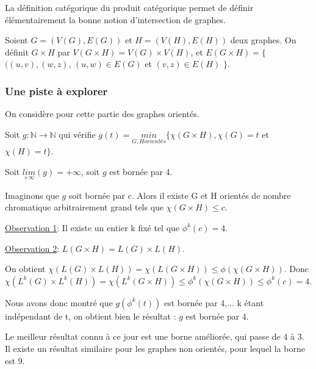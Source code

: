 La définition catégorique du produit catégorique permet de définir élémentairement la bonne notion d'intersection de graphes.

\begin{definition}
	Soient $G = (V(G),E(G))$ et $H = (V(H),E(H))$ deux graphes. On définit $G \times H$ par $V(G \times H) = V(G) \times V(H)$, et $E(G \times H) = \{$ $((u,v),(w,z)$, $(u,w) \in E(G)$ et $(v,z) \in E(H)$ $\}$.
\end{definition}

\subsubsection{Une piste à explorer}

On considère pour cette partie des graphes orientés.

Soit $g : \mathbb{N} \longrightarrow \mathbb{N}$ qui vérifie $g(t) = \underset{G,H orientés}{min} \{ \chi(G \times H), \chi(G) = t $ et $ \chi (H) = t \}$.

\begin{theoreme}
	Soit $\underset{+ \infty}{lim} (g) = + \infty$, soit $g$ est bornée par 4.
\end{theoreme}

\begin{preuve}
	Imaginons que $g$ soit bornée par c. Alors il existe G et H orientés de nombre chromatique arbitrairement grand tels que $\chi(G \times H) \le c$.
	
	\underline{Observation 1}: Il existe un entier k fixé tel que $\phi^k(c) = 4$.
	
	\underline{Observation 2}: $L(G \times H) = L(G) \times L(H)$.
	
	On obtient $\chi(L(G) \times L(H)) = \chi(L(G \times H)) \le \phi(\chi(G \times H))$.
	Donc $\chi(L^k(G) \times L^k(H)) = \chi(L^k(G \times H)) \le \phi^k(\chi(G \times H)) \le \phi^k(c) = 4$. 
	
	Nous avons donc montré que $g(\phi^k(t))$ est bornée par 4,... k étant indépendant de t, on obtient bien le résultat : $g$ est bornée par 4.
	
\end{preuve}



\begin{note}
	Le meilleur résultat connu à ce jour est une borne améliorée, qui passe de 4 à 3. Il existe un résultat similaire pour les graphes non orientés, pour lequel la borne est 9. 
\end{note}



